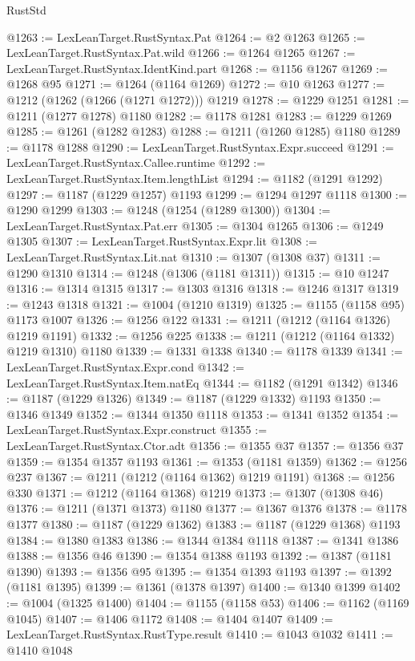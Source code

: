 \begin{lexlean}{RustStd}
\begin{coremodule}
@1263 := LexLeanTarget.RustSyntax.Pat
@1264 := @2 @1263
@1265 := LexLeanTarget.RustSyntax.Pat.wild
@1266 := @1264 @1265
@1267 := LexLeanTarget.RustSyntax.IdentKind.part
@1268 := @1156 @1267
@1269 := @1268 @95
@1271 := @1264 (@1164 @1269)
@1272 := @10 @1263
@1277 := @1212 (@1262 (@1266 (@1271 @1272))) @1219
@1278 := @1229 @1251
@1281 := @1211 (@1277 @1278) @1180
@1282 := @1178 @1281
@1283 := @1229 @1269
@1285 := @1261 (@1282 @1283)
@1288 := @1211 (@1260 @1285) @1180
@1289 := @1178 @1288
@1290 := LexLeanTarget.RustSyntax.Expr.succeed
@1291 := LexLeanTarget.RustSyntax.Callee.runtime
@1292 := LexLeanTarget.RustSyntax.Item.lengthList
@1294 := @1182 (@1291 @1292)
@1297 := @1187 (@1229 @1257) @1193
@1299 := @1294 @1297 @1118
@1300 := @1290 @1299
@1303 := @1248 (@1254 (@1289 @1300))
@1304 := LexLeanTarget.RustSyntax.Pat.err
@1305 := @1304 @1265
@1306 := @1249 @1305
@1307 := LexLeanTarget.RustSyntax.Expr.lit
@1308 := LexLeanTarget.RustSyntax.Lit.nat
@1310 := @1307 (@1308 @37)
@1311 := @1290 @1310
@1314 := @1248 (@1306 (@1181 @1311))
@1315 := @10 @1247
@1316 := @1314 @1315
@1317 := @1303 @1316
@1318 := @1246 @1317
@1319 := @1243 @1318
@1321 := @1004 (@1210 @1319)
@1325 := @1155 (@1158 @95) @1173 @1007
@1326 := @1256 @122
@1331 := @1211 (@1212 (@1164 @1326) @1219 @1191)
@1332 := @1256 @225
@1338 := @1211 (@1212 (@1164 @1332) @1219 @1310) @1180
@1339 := @1331 @1338
@1340 := @1178 @1339
@1341 := LexLeanTarget.RustSyntax.Expr.cond
@1342 := LexLeanTarget.RustSyntax.Item.natEq
@1344 := @1182 (@1291 @1342)
@1346 := @1187 (@1229 @1326)
@1349 := @1187 (@1229 @1332) @1193
@1350 := @1346 @1349
@1352 := @1344 @1350 @1118
@1353 := @1341 @1352
@1354 := LexLeanTarget.RustSyntax.Expr.construct
@1355 := LexLeanTarget.RustSyntax.Ctor.adt
@1356 := @1355 @37
@1357 := @1356 @37
@1359 := @1354 @1357 @1193
@1361 := @1353 (@1181 @1359)
@1362 := @1256 @237
@1367 := @1211 (@1212 (@1164 @1362) @1219 @1191)
@1368 := @1256 @330
@1371 := @1212 (@1164 @1368) @1219
@1373 := @1307 (@1308 @46)
@1376 := @1211 (@1371 @1373) @1180
@1377 := @1367 @1376
@1378 := @1178 @1377
@1380 := @1187 (@1229 @1362)
@1383 := @1187 (@1229 @1368) @1193
@1384 := @1380 @1383
@1386 := @1344 @1384 @1118
@1387 := @1341 @1386
@1388 := @1356 @46
@1390 := @1354 @1388 @1193
@1392 := @1387 (@1181 @1390)
@1393 := @1356 @95
@1395 := @1354 @1393 @1193
@1397 := @1392 (@1181 @1395)
@1399 := @1361 (@1378 @1397)
@1400 := @1340 @1399
@1402 := @1004 (@1325 @1400)
@1404 := @1155 (@1158 @53)
@1406 := @1162 (@1169 @1045)
@1407 := @1406 @1172
@1408 := @1404 @1407
@1409 := LexLeanTarget.RustSyntax.RustType.result
@1410 := @1043 @1032
@1411 := @1410 @1048

\end{coremodule}
\end{lexlean}
